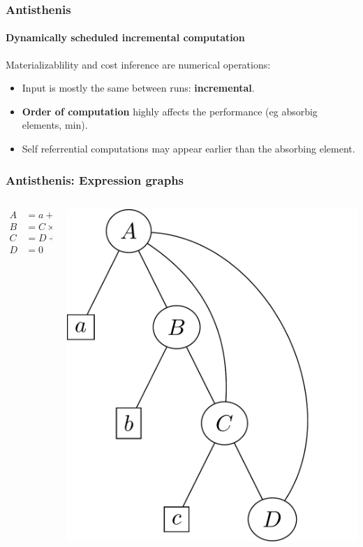 \begin{frame}
  \frametitle{Antisthenis}
  \framesubtitle{Dynamically scheduled incremental computation}

  Materializablility and cost inference are numerical operations:

  \begin{itemize}
  \item Input is mostly the same between runs: \textbf{incremental}.
  \item \textbf{Order of computation} highly affects the performance
    (eg absorbig elements, min).
  \item Self referrential computations may appear earlier than the
    absorbing element.
  \end{itemize}
\end{frame}

\begin{frame}
  \frametitle{Antisthenis: Expression graphs}
  \begin{columns}
    \begin{column}{0.5\textwidth}
      \begin{align*}
        A &= a + B + C + D  \\
        B &= C \times b \\
        C & = D + c \\
        D &= 0
      \end{align*}
    \end{column}
    \begin{column}{0.5\textwidth}
      \begin{center}
        \includegraphics[height=.6\textheight]{../imgs/example_antisthenis_dag.pdf}
      \end{center}
    \end{column}
  \end{columns}
\end{frame}


